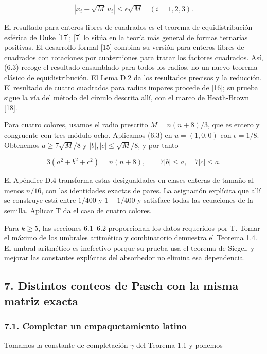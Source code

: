 \documentclass[spanish,11pt,a4paper]{article}
\begin{document}
\[|x_i-\sqrt M\,u_i|\le\epsilon\sqrt M\quad(i=1,2,3).\tag{6.3}\]

El resultado para enteros libres de cuadrados es el teorema de equidistribución esférica de Duke {[}17{]}; {[}7{]} lo sitúa en la teoría más general de formas ternarias positivas. El desarrollo formal {[}15{]} combina su versión para enteros libres de cuadrados con rotaciones por cuaterniones para tratar los factores cuadrados. Así, (6.3) recoge el resultado ensamblado para todos los radios, no un nuevo teorema clásico de equidistribución. El Lema D.2 da los resultados precisos y la reducción. El resultado de cuatro cuadrados para radios impares procede de {[}16{]}; su prueba sigue la vía del método del círculo descrita allí, con el marco de Heath-Brown {[}18{]}.

Para cuatro colores, usamos el radio prescrito \(M=n(n+8)/3\), que es entero y congruente con tres módulo ocho. Aplicamos (6.3) en \(u=(1,0,0)\) con \(\epsilon=1/8\). Obtenemos \(a\ge7\sqrt M/8\) y \(|b|,|c|\le\sqrt M/8\), y por tanto

\[3(a^2+b^2+c^2)=n(n+8),\qquad 7|b|\le a,\quad7|c|\le a.\]

El Apéndice D.4 transforma estas desigualdades en clases enteras de tamaño al menos \(n/16\), con las identidades exactas de pares. La asignación explícita que allí se construye está entre \(1/400\) y \(1-1/400\) y satisface todas las ecuaciones de la semilla. Aplicar T da el caso de cuatro colores.

Para \(k\ge5\), las secciones 6.1--6.2 proporcionan los datos requeridos por T. Tomar el máximo de los umbrales aritmético y combinatorio demuestra el Teorema 1.4. El umbral aritmético es inefectivo porque su prueba usa el teorema de Siegel, y mejorar las constantes explícitas del absorbedor no elimina esa dependencia.

\subsection{7. Distintos conteos de Pasch con la misma matriz exacta}\label{distintos-conteos-de-pasch-con-la-misma-matriz-exacta}

\subsubsection{7.1. Completar un empaquetamiento latino}\label{completar-un-empaquetamiento-latino}

Tomamos la constante de completación \(\gamma\) del Teorema 1.1 y ponemos
\end{document}
